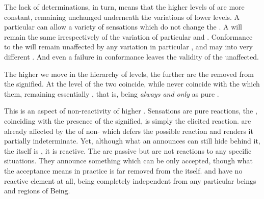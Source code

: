 \label{pa:constantVaried} The lack of  
determinations, in turn, means that the higher levels of  are
more constant, remaining unchanged underneath the variations of lower levels.
A particular  can allow a variety of sensations which do not change the
.  A  will remain the same irrespectively of the
variation of particular  and .  Conformance to the
 will remain unaffected by any
variation in particular ,  and may  into
very different . And even a failure in
conformance leaves the validity of the  unaffected.


\pa The higher we move in the hierarchy of levels, the further are the 
 removed from the signified.  At the level of 
the two coincide, while  never coincide with the
 which  them, remaining essentially
, that is, being  {\em always and only} as
 pure .
%

\label{nonreactive}
This is an aspect of non-reactivity of higher .  Sensations are
pure reactions, the , coinciding with the presence of the signified, is
simply the elicited reaction.   are already affected by the
 of non- which defers the possible reaction and
renders it partially indeterminate. Yet, although what an 
announces can still hide behind it, the  itself is ,
it is reactive.  The  are passive but are not reactions to
any specific situations. They announce something which can be only accepted,
though what the acceptance means in practice is far removed from the
 itself.  and  have no reactive
element at all, being completely independent from any particular beings and
regions of Being.

